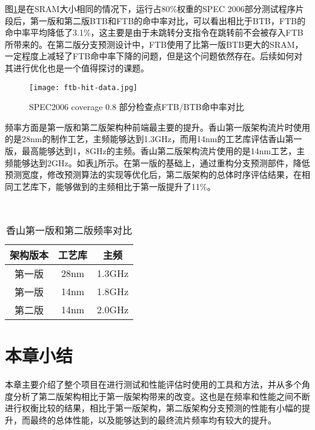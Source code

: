 图\ref{fig:figure63}是在SRAM大小相同的情况下，运行占80\%权重的SPEC 2006部分测试程序片段后，第一版和第二版BTB和FTB的命中率对比，可以看出相比于BTB，FTB的命中率平均降低了3.1\%，这主要是由于未跳转分支指令在跳转前不会被存入FTB所带来的。在第二版分支预测设计中，FTB使用了比第一版BTB更大的SRAM，一定程度上减轻了FTB命中率下降的问题，但是这个问题依然存在。后续如何对其进行优化也是一个值得探讨的课题。



\begin{figure}[htb]
	\centering
	\setlength\tabcolsep{3pt}  %
	\vspace{5pt} %
	\texttt{[image: ftb-hit-data.jpg]}
	\caption{SPEC2006 coverage 0.8 部分检查点FTB/BTB命中率对比}
	\label{fig:figure63}
\end{figure}


频率方面是第一版和第二版架构种前端最主要的提升。香山第一版架构流片时使用的是28nm的制作工艺，主频能够达到1.3GHz，而用14nm的工艺库评估香山第一版，最高能够达到1，8GHz的主频。香山第二版架构流片使用的是14nm工艺，主频能够达到2GHz。如表\ref{tb:table3}所示。在第一版的基础上，通过重构分支预测部件，降低预测宽度，修改预测算法的实现等优化后，第二版架构的总体时序评估结果，在相同工艺库下，能够做到的主频相比于第一版提升了11\%。

~\\

\begin{table}[!h]
	\caption{香山第一版和第二版频率对比}
	\label{tb:table3}
	\centering
	\begin{tabular}{|c|c|c|}
		\hline
		架构版本   & 工艺库   & 主频   \\ \hline
		第一版 & 28nm & 1.3GHz \\ \hline
		第一版 & 14nm & 1.8GHz \\ \hline
		第二版 & 14nm & 2.0GHz \\ \hline
	\end{tabular}
\end{table}


\section{本章小结}

本章主要介绍了整个项目在进行测试和性能评估时使用的工具和方法，并从多个角度分析了第二版架构相比于第一版架构带来的改变。这也是在频率和性能之间不断进行权衡比较的结果，相比于第一版架构，第二版架构分支预测的性能有小幅的提升，而最终的总体性能，以及能够达到的最终流片频率均有较大的提升。